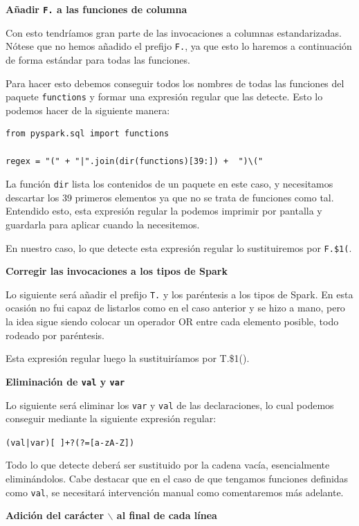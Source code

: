 \documentclass[12pt,twoside,titlepage]{report}
\begin{document}
\textbf{Añadir \texttt{F.} a las funciones de columna}

Con esto tendríamos gran parte de las invocaciones a columnas estandarizadas. Nótese que no hemos añadido el prefijo \texttt{F.}, ya que esto lo haremos a continuación de forma estándar para todas las funciones.

Para hacer esto debemos conseguir todos los nombres de todas las funciones del paquete \texttt{functions} y formar una expresión regular que las detecte. Esto lo podemos hacer de la siguiente manera:

\begin{lstlisting}
from pyspark.sql import functions

regex = "(" + "|".join(dir(functions)[39:]) +  ")\("
\end{lstlisting}

La función \texttt{dir} lista los contenidos de un paquete en este caso, y necesitamos descartar los 39 primeros elementos ya que no se trata de funciones como tal. Entendido esto, esta expresión regular la podemos imprimir por pantalla y guardarla para aplicar cuando la necesitemos.

En nuestro caso, lo que detecte esta expresión regular lo sustituiremos por \texttt{F.\$1(}.


\textbf{Corregir las invocaciones a los tipos de Spark}

Lo siguiente será añadir el prefijo \texttt{T.} y los paréntesis a los tipos de Spark. En esta ocasión no fui capaz de listarlos como en el caso anterior y se hizo a mano, pero la idea sigue siendo colocar un operador OR entre cada elemento posible, todo rodeado por paréntesis.

Esta expresión regular luego la sustituiríamos por T.\$1().


\textbf{Eliminación de \texttt{val} y \texttt{var}}

Lo siguiente será eliminar los \texttt{var} y \texttt{val} de las declaraciones, lo cual podemos conseguir mediante la siguiente expresión regular:

\texttt{(val|var)[ ]+?(?=[a-zA-Z])}

Todo lo que detecte deberá ser sustituido por la cadena vacía, esencialmente eliminándolos. Cabe destacar que en el caso de que tengamos funciones definidas como \texttt{val}, se necesitará intervención manual como comentaremos más adelante.


\textbf{Adición del carácter \texttt{$\backslash$} al final de cada línea}
\end{document}
